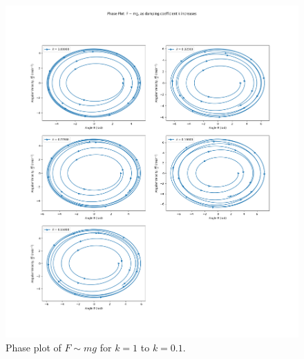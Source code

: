 \documentclass[10pt, twocolumn]{article}
\begin{document}
\begin{figure}[H]
    \centering
    \includegraphics[width = \columnwidth]{Projects/ForcedSimplePendulum/Plots/Phase plot of F~mg as damping coefficient k increases from 1 to 0.1.png}
    \caption{Phase plot of $F \sim{mg}$ for $k = 1$ to $k = 0.1$.}
    \label{Phase plot of k 1 to 0.1}
\end{figure}
\end{document}
